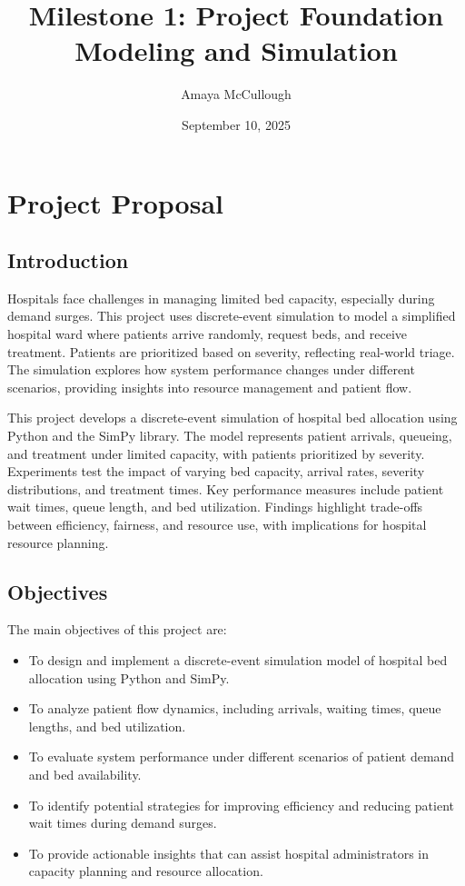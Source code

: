 \documentclass[12pt]{article}
\title{Milestone 1: Project Foundation \\ \large Modeling and Simulation}
\author{Amaya McCullough}
\date{September 10, 2025}
\begin{document}
\maketitle
\tableofcontents
\newpage

\section{Project Proposal}
\subsection{Introduction}

Hospitals face challenges in managing limited bed capacity, especially during demand surges. 
This project uses discrete-event simulation to model a simplified hospital ward where patients arrive randomly, request beds, and receive treatment. 
Patients are prioritized based on severity, reflecting real-world triage. 
The simulation explores how system performance changes under different scenarios, providing insights into resource management and patient flow.

This project develops a discrete-event simulation of hospital bed allocation using Python and the SimPy library. 
The model represents patient arrivals, queueing, and treatment under limited capacity, with patients prioritized by severity. 
Experiments test the impact of varying bed capacity, arrival rates, severity distributions, and treatment times. 
Key performance measures include patient wait times, queue length, and bed utilization. 
Findings highlight trade-offs between efficiency, fairness, and resource use, with implications for hospital resource planning.



\subsection{Objectives}
The main objectives of this project are:
\begin{itemize}
    \item To design and implement a discrete-event simulation model of hospital bed allocation using Python and SimPy.
    \item To analyze patient flow dynamics, including arrivals, waiting times, queue lengths, and bed utilization.
    \item To evaluate system performance under different scenarios of patient demand and bed availability.
    \item To identify potential strategies for improving efficiency and reducing patient wait times during demand surges.
    \item To provide actionable insights that can assist hospital administrators in capacity planning and resource allocation.
\end{itemize}
\end{document}
